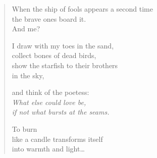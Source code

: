 \clearpage

\begin{verse}
When the ship of fools appears a second time\\
the brave ones board it.\\
And me?

I draw with my toes in the sand,\\
collect bones of dead birds,\\
show the starfish to their brothers\\
in the sky,

and think of the poetess:\label{poetess}\\
{\itshape What else could love be,\\
if not what bursts at the seams.}

To burn\\
like a candle transforms itself\\
into warmth and light\ldots

\end{verse}
